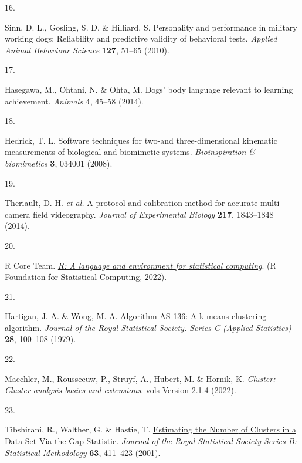 \documentclass[
]{article}
\newlength{\cslhangindent}
\newlength{\csllabelwidth}
\newlength{\cslentryspacingunit} %
\newenvironment{CSLReferences}[2] %
 {%
  \setlength{\parindent}{0pt}
  \ifodd #1
  \let\oldpar\par
  \def\par{\hangindent=\cslhangindent\oldpar}
  \fi
  \setlength{\parskip}{#2\cslentryspacingunit}
 }%
 {}
\newcommand{\CSLLeftMargin}[1]{\parbox[t]{\csllabelwidth}{#1}}
\newcommand{\CSLRightInline}[1]{\parbox[t]{\linewidth - \csllabelwidth}{#1}\break}
\begin{document}
\begin{CSLReferences}{0}{0}
\leavevmode{}%
\CSLLeftMargin{16. }%
\CSLRightInline{Sinn, D. L., Gosling, S. D. \& Hilliard, S. Personality and performance in military working dogs: Reliability and predictive validity of behavioral tests. \emph{Applied Animal Behaviour Science} \textbf{127}, 51--65 (2010).}

\leavevmode{}%
\CSLLeftMargin{17. }%
\CSLRightInline{Hasegawa, M., Ohtani, N. \& Ohta, M. Dogs' body language relevant to learning achievement. \emph{Animals} \textbf{4}, 45--58 (2014).}

\leavevmode{}%
\CSLLeftMargin{18. }%
\CSLRightInline{Hedrick, T. L. Software techniques for two-and three-dimensional kinematic measurements of biological and biomimetic systems. \emph{Bioinspiration \& biomimetics} \textbf{3}, 034001 (2008).}

\leavevmode{}%
\CSLLeftMargin{19. }%
\CSLRightInline{Theriault, D. H. \emph{et al.} A protocol and calibration method for accurate multi-camera field videography. \emph{Journal of Experimental Biology} \textbf{217}, 1843--1848 (2014).}

\leavevmode{}%
\CSLLeftMargin{20. }%
\CSLRightInline{R Core Team. \emph{\href{https://www.R-project.org}{R: A language and environment for statistical computing}}. (R Foundation for Statistical Computing, 2022).}

\leavevmode{}%
\CSLLeftMargin{21. }%
\CSLRightInline{Hartigan, J. A. \& Wong, M. A. \href{http://www.jstor.org/stable/2346830}{Algorithm AS 136: A k-means clustering algorithm}. \emph{Journal of the Royal Statistical Society. Series C (Applied Statistics)} \textbf{28}, 100--108 (1979).}

\leavevmode{}%
\CSLLeftMargin{22. }%
\CSLRightInline{Maechler, M., Rousseeuw, P., Struyf, A., Hubert, M. \& Hornik, K. \emph{\href{https://CRAN.R-project.org/package=cluster}{Cluster: Cluster analysis basics and extensions}}. vols Version 2.1.4 (2022).}

\leavevmode{}%
\CSLLeftMargin{23. }%
\CSLRightInline{Tibshirani, R., Walther, G. \& Hastie, T. \href{https://doi.org/10.1111/1467-9868.00293}{Estimating the {Number} of {Clusters} in a {Data} {Set} {Via} the {Gap} {Statistic}}. \emph{Journal of the Royal Statistical Society Series B: Statistical Methodology} \textbf{63}, 411--423 (2001).}

\end{CSLReferences}
\end{document}

